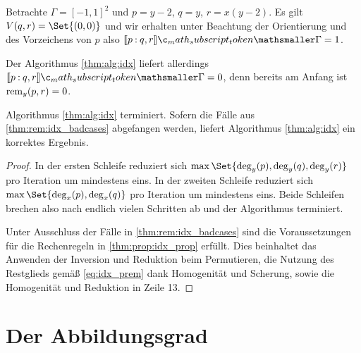 \documentclass{mythesis}
\begin{document}
\begin{example} \label{thm:ex:idx_nullext}
    Betrachte $\Gamma = [-1,1]^2$ und $p = y - 2$, $q = y$, $r = x(y - 2)$.
    Es gilt $V(q,r) = \Set{(0,0)}$ und wir erhalten unter Beachtung der Orientierung und des Vorzeichens von $p$ also $\Index{\Gamma}{p}{q,r} = 1$.

    Der Algorithmus \ref{thm:alg:idx} liefert allerdings $\Index{\Gamma}{p}{q,r} = 0$, denn bereits am Anfang ist $\operatorname{rem}_y(p,r) = 0$.
\end{example}

\begin{proposition}
    Algorithmus \ref{thm:alg:idx} terminiert.
    Sofern die Fälle aus \ref{thm:rem:idx_badcases} abgefangen werden, liefert Algorithmus \ref{thm:alg:idx} ein korrektes Ergebnis.
    \begin{proof}
        In der ersten Schleife reduziert sich $\max\Set{\deg_y(p), \deg_y(q), \deg_y(r)}$ pro Iteration um mindestens eins.
        In der zweiten Schleife reduziert sich $\max\Set{\deg_x(p), \deg_x(q)}$ pro Iteration um mindestens eins.
        Beide Schleifen brechen also nach endlich vielen Schritten ab und der Algorithmus terminiert.

        Unter Ausschluss der Fälle in \ref{thm:rem:idx_badcases} sind die Voraussetzungen für die Rechenregeln in \ref{thm:prop:idx_prop} erfüllt.
        Dies beinhaltet das Anwenden der Inversion und Reduktion beim Permutieren, die Nutzung des Restglieds gemäß \eqref{eq:idx_prem} dank Homogenität und Scherung, sowie die Homogenität und Reduktion in Zeile 13.
    \end{proof}
\end{proposition}


\section{Der Abbildungsgrad}



















\end{document}
